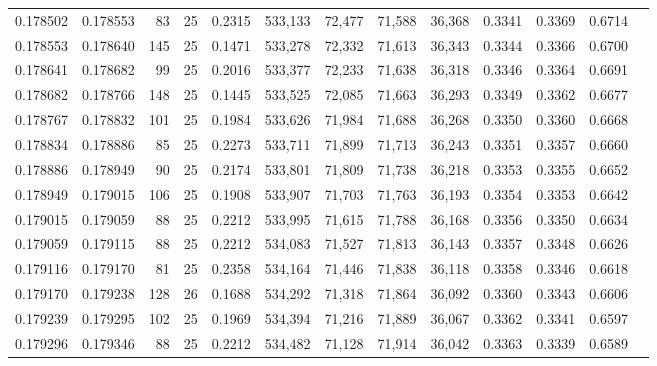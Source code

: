 \begin{tabular}{rrrrrrrrrrrrr}
0.178502 & 0.178553 &    83 &  25 &                                     0.2315 & 533,133 &  72,477 &  71,588 &  36,368 & 0.3341 & 0.3369 & 0.6714 \\
0.178553 & 0.178640 &   145 &  25 &                                     0.1471 & 533,278 &  72,332 &  71,613 &  36,343 & 0.3344 & 0.3366 & 0.6700 \\
0.178641 & 0.178682 &    99 &  25 &                                     0.2016 & 533,377 &  72,233 &  71,638 &  36,318 & 0.3346 & 0.3364 & 0.6691 \\
0.178682 & 0.178766 &   148 &  25 &                                     0.1445 & 533,525 &  72,085 &  71,663 &  36,293 & 0.3349 & 0.3362 & 0.6677 \\
0.178767 & 0.178832 &   101 &  25 &                                     0.1984 & 533,626 &  71,984 &  71,688 &  36,268 & 0.3350 & 0.3360 & 0.6668 \\
0.178834 & 0.178886 &    85 &  25 &                                     0.2273 & 533,711 &  71,899 &  71,713 &  36,243 & 0.3351 & 0.3357 & 0.6660 \\
0.178886 & 0.178949 &    90 &  25 &                                     0.2174 & 533,801 &  71,809 &  71,738 &  36,218 & 0.3353 & 0.3355 & 0.6652 \\
0.178949 & 0.179015 &   106 &  25 &                                     0.1908 & 533,907 &  71,703 &  71,763 &  36,193 & 0.3354 & 0.3353 & 0.6642 \\
0.179015 & 0.179059 &    88 &  25 &                                     0.2212 & 533,995 &  71,615 &  71,788 &  36,168 & 0.3356 & 0.3350 & 0.6634 \\
0.179059 & 0.179115 &    88 &  25 &                                     0.2212 & 534,083 &  71,527 &  71,813 &  36,143 & 0.3357 & 0.3348 & 0.6626 \\
0.179116 & 0.179170 &    81 &  25 &                                     0.2358 & 534,164 &  71,446 &  71,838 &  36,118 & 0.3358 & 0.3346 & 0.6618 \\
0.179170 & 0.179238 &   128 &  26 &                                     0.1688 & 534,292 &  71,318 &  71,864 &  36,092 & 0.3360 & 0.3343 & 0.6606 \\
0.179239 & 0.179295 &   102 &  25 &                                     0.1969 & 534,394 &  71,216 &  71,889 &  36,067 & 0.3362 & 0.3341 & 0.6597 \\
0.179296 & 0.179346 &    88 &  25 &                                     0.2212 & 534,482 &  71,128 &  71,914 &  36,042 & 0.3363 & 0.3339 & 0.6589 \\

\end{tabular}
